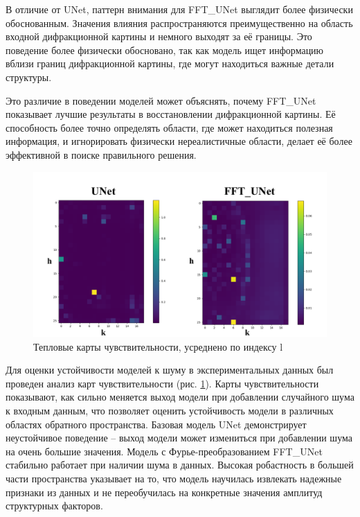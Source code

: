 В отличие от UNet, паттерн внимания для FFT\_UNet выглядит более физически обоснованным. Значения влияния распространяются преимущественно на область входной дифракционной картины и немного выходят за её границы. Это поведение более физически обосновано, так как модель ищет информацию вблизи границ дифракционной картины, где могут находиться важные детали структуры. 

Это различие в поведении моделей может объяснять, почему FFT\_UNet показывает лучшие результаты в восстановлении дифракционной картины. Её способность более точно определять области, где может находиться полезная информация, и игнорировать физически нереалистичные области, делает её более эффективной в поиске правильного решения.



\begin{figure}[H]
    \centering
    \includegraphics[width=1\textwidth]{figures/sensitivity.png}
    \caption{Тепловые карты чувствительности, усреднено по индексу l}
    \label{sens}
\end{figure}


Для оценки устойчивости моделей к шуму в экспериментальных данных был проведен анализ карт чувствительности (рис. \ref{sens}). Карты чувствительности показывают, как сильно меняется выход модели при добавлении случайного шума к входным данным, что позволяет оценить устойчивость модели в различных областях обратного пространства. Базовая модель UNet демонстрирует неустойчивое поведение – выход модели может измениться при добавлении шума на очень большие значения. Модель с Фурье-преобразованием FFT\_UNet стабильно работает при наличии шума в данных. Высокая робастность в большей части пространства указывает на то, что модель научилась извлекать надежные признаки из данных и не переобучилась на конкретные значения амплитуд структурных факторов. 



